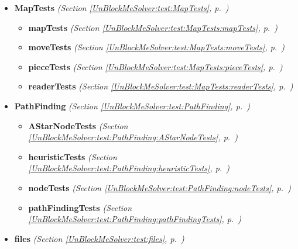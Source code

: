 \begin{itemize}
\setlength{\parskip}{0ex}
\item \textbf{MapTests}
  \textit{(Section \ref{UnBlockMeSolver:test:MapTests}, p.~\pageref{UnBlockMeSolver:test:MapTests})}

  \begin{itemize}
\setlength{\parskip}{0ex}
    \item \textbf{mapTests}
  \textit{(Section \ref{UnBlockMeSolver:test:MapTests:mapTests}, p.~\pageref{UnBlockMeSolver:test:MapTests:mapTests})}

    \item \textbf{moveTests}
  \textit{(Section \ref{UnBlockMeSolver:test:MapTests:moveTests}, p.~\pageref{UnBlockMeSolver:test:MapTests:moveTests})}

    \item \textbf{pieceTests}
  \textit{(Section \ref{UnBlockMeSolver:test:MapTests:pieceTests}, p.~\pageref{UnBlockMeSolver:test:MapTests:pieceTests})}

    \item \textbf{readerTests}
  \textit{(Section \ref{UnBlockMeSolver:test:MapTests:readerTests}, p.~\pageref{UnBlockMeSolver:test:MapTests:readerTests})}

  \end{itemize}
\item \textbf{PathFinding}
  \textit{(Section \ref{UnBlockMeSolver:test:PathFinding}, p.~\pageref{UnBlockMeSolver:test:PathFinding})}

  \begin{itemize}
\setlength{\parskip}{0ex}
    \item \textbf{AStarNodeTests}
  \textit{(Section \ref{UnBlockMeSolver:test:PathFinding:AStarNodeTests}, p.~\pageref{UnBlockMeSolver:test:PathFinding:AStarNodeTests})}

    \item \textbf{heuristicTests}
  \textit{(Section \ref{UnBlockMeSolver:test:PathFinding:heuristicTests}, p.~\pageref{UnBlockMeSolver:test:PathFinding:heuristicTests})}

    \item \textbf{nodeTests}
  \textit{(Section \ref{UnBlockMeSolver:test:PathFinding:nodeTests}, p.~\pageref{UnBlockMeSolver:test:PathFinding:nodeTests})}

    \item \textbf{pathFindingTests}
  \textit{(Section \ref{UnBlockMeSolver:test:PathFinding:pathFindingTests}, p.~\pageref{UnBlockMeSolver:test:PathFinding:pathFindingTests})}

  \end{itemize}
\item \textbf{files}
  \textit{(Section \ref{UnBlockMeSolver:test:files}, p.~\pageref{UnBlockMeSolver:test:files})}

\end{itemize}


